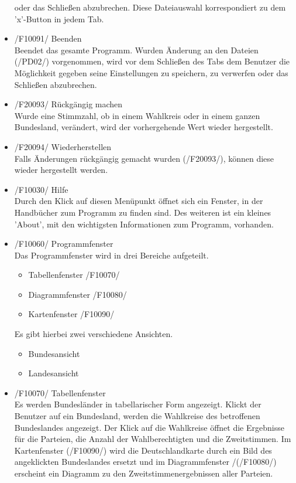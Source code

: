 \documentclass[10pt,a4paper]{article}
\begin{document}
\begin{itemize}
	oder das Schließen abzubrechen. Diese Dateiauswahl korrespondiert zu dem 'x'-Button in jedem Tab.
	\item /F10091/ Beenden \hfill \\
	Beendet das gesamte Programm. Wurden Änderung an den Dateien (/PD02/) vorgenommen, wird vor dem Schließen des Tabs dem Benutzer die Möglichkeit gegeben seine Einstellungen zu speichern, zu verwerfen 
	oder das Schließen abzubrechen.
	\item /F20093/ Rückgängig machen \hfill \\
	Wurde eine Stimmzahl, ob in einem Wahlkreis oder in einem ganzen Bundesland, verändert, wird der vorhergehende Wert wieder hergestellt.
	\item /F20094/ Wiederherstellen \hfill \\
	Falls Änderungen rückgängig gemacht wurden (/F20093/), können diese wieder hergestellt werden.
	\item /F10030/ Hilfe \hfill \\
	Durch den Klick auf diesen Menüpunkt öffnet sich ein Fenster, in der Handbücher zum Programm zu finden sind. Des weiteren ist ein kleines 'About', mit den wichtigsten Informationen zum Programm, vorhanden.
	\item /F10060/ Programmfenster \hfill \\
	Das Programmfenster wird in drei Bereiche aufgeteilt.
	\begin{itemize}
		\item Tabellenfenster /F10070/
		\item Diagrammfenster /F10080/
		\item Kartenfenster /F10090/
	\end{itemize}
	Es gibt hierbei zwei verschiedene Ansichten.
	\begin{itemize}
		\item Bundesansicht
		\item Landesansicht
	\end{itemize}
	\item /F10070/ Tabellenfenster \hfill \\
	Es werden Bundesländer in tabellarischer Form angezeigt. Klickt der Benutzer auf ein Bundesland, werden die Wahlkreise des betroffenen Bundeslandes angezeigt. Der Klick auf die Wahlkreise öffnet die Ergebnisse für die Parteien, die Anzahl der Wahlberechtigten und die Zweitstimmen. Im Kartenfenster (/F10090/) wird die Deutschlandkarte durch ein Bild des angeklickten Bundeslandes ersetzt und im Diagrammfenster /(/F10080/) erscheint ein Diagramm zu den Zweitstimmenergebnissen aller Parteien. \\

\end{itemize}
\end{document}
